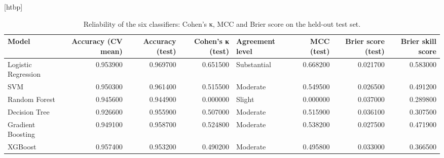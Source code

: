 \begin{table}
\small[htbp]
\caption{Reliability of the six classifiers: Cohen's κ, MCC and Brier score on the held-out test set.}
\label{tab:T09_kappa_brier}
\begin{tabular}{lrrrlrrr}
\toprule
Model & Accuracy (CV mean) & Accuracy (test) & Cohen's κ (test) & Agreement level & MCC (test) & Brier score (test) & Brier skill score \\
\midrule
Logistic Regression & 0.953900 & 0.969700 & 0.651500 & Substantial & 0.668200 & 0.021700 & 0.583000 \\
SVM & 0.950300 & 0.961400 & 0.515500 & Moderate & 0.549500 & 0.026500 & 0.491200 \\
Random Forest & 0.945600 & 0.944900 & 0.000000 & Slight & 0.000000 & 0.037000 & 0.289800 \\
Decision Tree & 0.926600 & 0.955900 & 0.507000 & Moderate & 0.515900 & 0.036100 & 0.307500 \\
Gradient Boosting & 0.949100 & 0.958700 & 0.524800 & Moderate & 0.538200 & 0.027500 & 0.471900 \\
XGBoost & 0.957400 & 0.953200 & 0.490200 & Moderate & 0.495800 & 0.033000 & 0.366500 \\
\bottomrule
\end{tabular}
\end{table}
